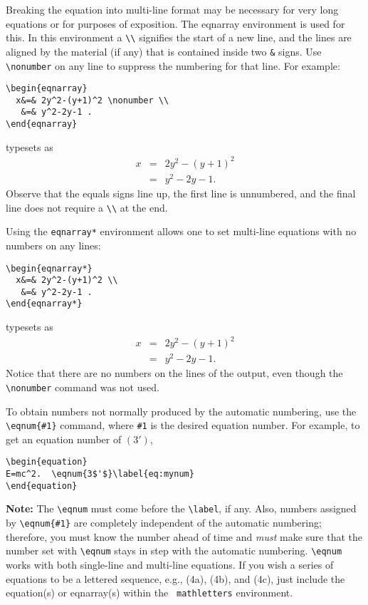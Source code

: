 Breaking the equation into multi-line format may be necessary for very long
equations or for purposes of exposition.
The eqnarray environment is used for this. In this
environment a \verb+\\+ signifies the start of a new line, and the lines
are aligned by the material (if any) that is contained inside two \verb+&+
signs. Use \verb+\nonumber+ on any line to suppress the numbering for that
line. For example:
\se\begin{verbatim}
\begin{eqnarray}
  x&=& 2y^2-(y+1)^2 \nonumber \\
   &=& y^2-2y-1 .
\end{eqnarray}
\end{verbatim}\ee
\noindent typesets as
\se\begin{eqnarray}x&=& 2y^2-(y+1)^2 \nonumber \\
&=& y^2-2y-1 .
\end{eqnarray}\ee\noindent
Observe that the equals signs line up, the first line is unnumbered, and
the final line does not require a \verb+\\+ at the end.

Using the \verb+eqnarray*+ environment allows one to set multi-line equations
with no numbers on any lines:
\se\begin{verbatim}
\begin{eqnarray*}
  x&=& 2y^2-(y+1)^2 \\
   &=& y^2-2y-1 .
\end{eqnarray*}
\end{verbatim}\ee
\noindent typesets as
\se\begin{eqnarray*} x&=& 2y^2-(y+1)^2 \\
 &=& y^2-2y-1 .
\end{eqnarray*}\ee\noindent
Notice that there are no numbers on the lines of the output, even though
the \verb+\nonumber+ command was not used.


To obtain numbers not normally produced by the automatic numbering,
use the \verb+\eqnum{#1}+ command, where \verb+#1+ is the desired
equation number. For example, to get an equation number of
$(3')$,
\se\begin{verbatim}
\begin{equation}
E=mc^2.  \eqnum{3$'$}\label{eq:mynum}
\end{equation}
\end{verbatim}\ee\noindent
{\bf Note:} The \verb+\eqnum+ must come before the \verb+\label+, if any. Also,
numbers assigned by \verb+\eqnum{#1}+ are completely independent of the
automatic numbering; therefore, you must know the number ahead of time and 
{\it must\/} make sure that the number set with \verb+\eqnum+ stays in step
with the automatic numbering.
\verb+\eqnum+ works with both single-line and multi-line equations.
If you wish a series of equations to be a lettered sequence, e.g., (4a),
(4b), and (4c), just include the equation(s) or eqnarray(s) within the {\tt
mathletters} environment.

